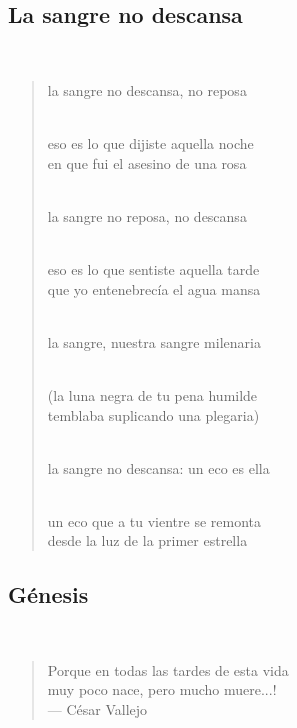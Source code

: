 \documentclass[a4paper, 12pt]{article}
\begin{document}
\pagebreak
\subsection{La sangre no descansa}
~ 

\begin{verse}
    
la sangre no descansa, no reposa\\
~ 

eso es lo que dijiste aquella noche\\
en que fui el asesino de una rosa\\
~ 

la sangre no reposa, no descansa\\
~ 

eso es lo que sentiste aquella tarde\\
que yo entenebrecía el agua mansa\\
~ 

la sangre, nuestra sangre milenaria\\
~ 

(la luna negra de tu pena humilde\\
temblaba suplicando una plegaria)\\
~ 

la sangre no descansa: un eco es ella\\
~ 

un eco que a tu vientre se remonta\\
desde la luz de la primer estrella\\
\end{verse}

\pagebreak 
\subsection{Génesis}
~ 
\begin{quote}
\footnotesize    
    \hspace*{\fill} Porque en todas las tardes de esta vida\\ \hspace*{\fill}muy poco nace, pero mucho muere...!\\
\hspace*{\fill}— César Vallejo

\end{quote}
\normalsize
\end{document}
